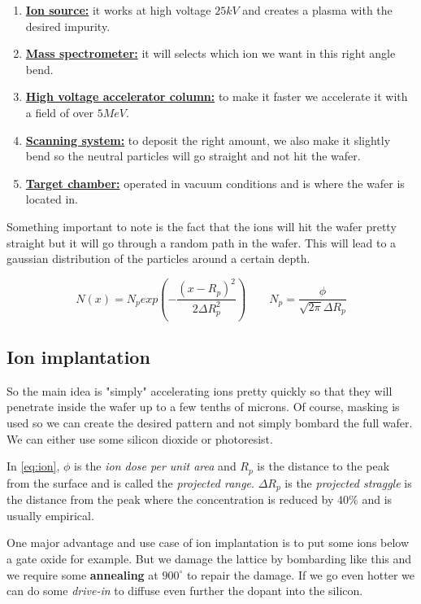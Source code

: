 \documentclass{report}
\begin{document}
\begin{enumerate}
    \item \underline{\textbf{Ion source:}} it works at high voltage $25 kV$ and creates a plasma with the desired impurity.
    \item \underline{\textbf{Mass spectrometer:}} it will selects which ion we want in this right angle bend.
    \item \underline{\textbf{High voltage accelerator column:}} to make it faster we accelerate it with a field of over $5MeV$.
    \item \underline{\textbf{Scanning system:}} to deposit the right amount, we also make it slightly bend so the neutral particles will go straight and not hit the wafer.
    \item \underline{\textbf{Target chamber:}} operated in vacuum conditions and is where the wafer is located in.
\end{enumerate}

Something important to note is the fact that the ions will hit the wafer pretty straight but it will go through a random path in the wafer. This will lead to a gaussian distribution of the particles around a certain depth.

\begin{equation}
    N(x) = N_p exp \left( - \frac{(x-R_p)^2}{2 \Delta R_p^2} \right) \qquad N_p = \frac{\phi}{\sqrt{2 \pi} \Delta R_p}
    \label{eq:ion}
\end{equation}

\subsection{Ion implantation}

So the main idea is "simply" accelerating ions pretty quickly so that they will penetrate inside the wafer up to a few tenths of microns. Of course, masking is used so we can create the desired pattern and not simply bombard the full wafer. We can either use some silicon dioxide or photoresist.

In \ref{eq:ion}, $\phi$ is the \textit{ion dose per unit area} and $R_p$ is the distance to the peak from the surface and is called the \textit{projected range}. $\Delta R_p$ is the \textit{projected straggle} is the distance from the peak where the concentration is reduced by $40\%$ and is usually empirical.

One major advantage and use case of ion implantation is to put some ions below a gate oxide for example. But we damage the lattice by bombarding like this and we require some \textbf{annealing} at $900^\circ$ to repair the damage. If we go even hotter we can do some \textit{drive-in} to diffuse even further the dopant into the silicon.
\end{document}
